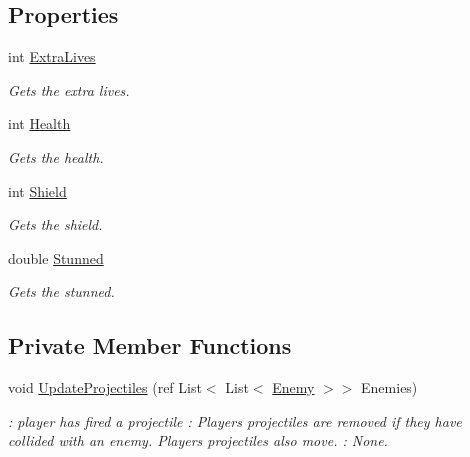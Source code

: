\subsection*{Properties}
\begin{DoxyCompactItemize}
\item 
int \hyperlink{classXaria_1_1Player_a4674dac15dedc7b171948e87393ee17b}{Extra\+Lives}
\begin{DoxyCompactList}\small\item\em Gets the extra lives. \end{DoxyCompactList}\item 
int \hyperlink{classXaria_1_1Player_a48a4972a17acb525adca1a30454eaf30}{Health}
\begin{DoxyCompactList}\small\item\em Gets the health. \end{DoxyCompactList}\item 
int \hyperlink{classXaria_1_1Player_a9f03b368b1fa510b106921d0033365e5}{Shield}
\begin{DoxyCompactList}\small\item\em Gets the shield. \end{DoxyCompactList}\item 
double \hyperlink{classXaria_1_1Player_ae675000d7990d74024d26bfa9691d722}{Stunned}
\begin{DoxyCompactList}\small\item\em Gets the stunned. \end{DoxyCompactList}\end{DoxyCompactItemize}
\subsection*{Private Member Functions}
\begin{DoxyCompactItemize}
\item 
void \hyperlink{classXaria_1_1Player_a2604251ff8bb846e1c3cbc5f05e09be2}{Update\+Projectiles} (ref List$<$ List$<$ \hyperlink{classXaria_1_1Enemy}{Enemy} $>$$>$ Enemies)
\begin{DoxyCompactList}\small\item\em \+: player has fired a projectile \+: Players projectiles are removed if they have collided with an enemy. Players projectiles also move. \+: None. \end{DoxyCompactList}\end{DoxyCompactItemize}
